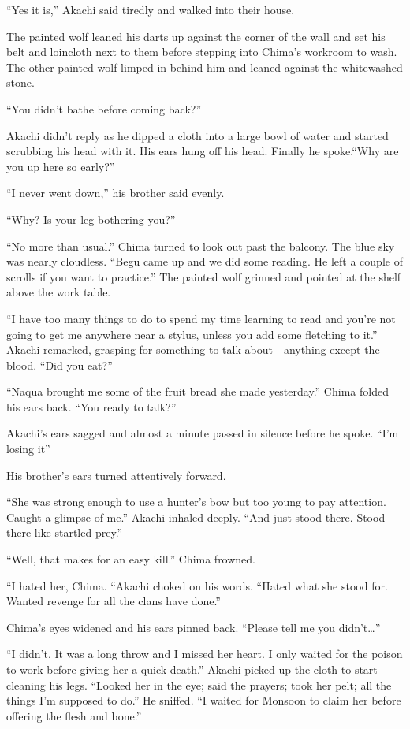 ``Yes it is,'' Akachi said tiredly and walked into their house.

The painted wolf leaned his darts up against the corner of the wall and set his belt and loincloth next to them before stepping into Chima's workroom to wash. The other painted wolf limped in behind him and leaned against the whitewashed stone.

``You didn't bathe before coming back?''

Akachi didn't reply as he dipped a cloth into a large bowl of water and started scrubbing his head with it. His ears hung off his head. Finally he spoke.``Why are you up here so early?''

``I never went down,'' his brother said evenly.

``Why? Is your leg bothering you?''

``No more than usual.'' Chima turned to look out past the balcony. The blue sky was nearly cloudless. ``Begu came up and we did some reading. He left a couple of scrolls if you want to practice.'' The painted wolf grinned and pointed at the shelf above the work table.

``I have too many things to do to spend my time learning to read and you're not going to get me anywhere near a stylus, unless you add some fletching to it.'' Akachi remarked, grasping for something to talk about---anything except the blood. ``Did you eat?''

``Naqua brought me some of the fruit bread she made yesterday.'' Chima folded his ears back. ``You ready to talk?''

Akachi's ears sagged and almost a minute passed in silence before he spoke. ``I'm losing it''

His brother's ears turned attentively forward.

``She was strong enough to use a hunter's bow but too young to pay attention. Caught a glimpse of me.'' Akachi inhaled deeply. ``And just stood there. Stood there like startled prey.''

``Well, that makes for an easy kill.'' Chima frowned.

``I hated her, Chima. ``Akachi choked on his words. ``Hated what she stood for. Wanted revenge for all the clans have done.''

Chima's eyes widened and his ears pinned back. ``Please tell me you didn't\ldots''

``I didn't. It was a long throw and I missed her heart. I only waited for the poison to work before giving her a quick death.'' Akachi picked up the cloth to start cleaning his legs. ``Looked her in the eye; said the prayers; took her pelt; all the things I'm supposed to do.'' He sniffed. ``I waited for Monsoon to claim her before offering the flesh and bone.''


